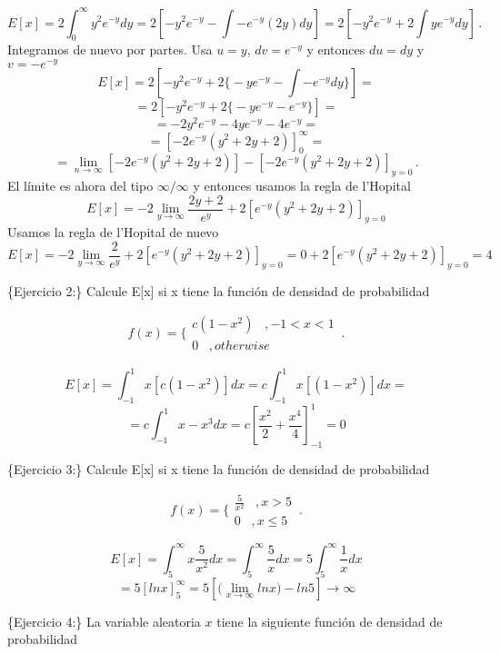 \documentclass[
]{agujournal2019}
\begin{document}
\[E[x]=2\int^\infty_0y^2e^{-y}dy=2\left[ -y^2e^{-y}-\int-e^{-y}(2y)dy\right]
      =2\left[ -y^2e^{-y}+2\int ye^{-y}dy\right]\,.\] Integramos de
nuevo por partes. Usa \(u=y\), \(dv=e^{-y}\) y entonces \(du=dy\) y
\(v=-e^{-y}\)
\[E[x]=2\left[ -y^2 e^{-y} + 2 \Big\{ -y e^{-y} - \int -e^{-y}dy \Big\} \right]=\]
\[=2\left[ -y^2 e^{-y} + 2 \Big\{ -y e^{-y} - e^{-y}         \Big\} \right]=\]
\[=-2y^2e^{-y}-4ye^{-y}-4e^{-y}=\]
\[=\left[ -2e^{-y}(y^2+2y+2) \right]^{\infty}_0=\]
\[=\lim_{n \to\infty}\left[ -2e^{-y}(y^2+2y+2) \right]-\left[ -2e^{-y}(y^2+2y+2) \right]_{y=0}\,.\]
El límite es ahora del tipo \(\infty/\infty\) y entonces usamos la regla
de l'Hopital
\[E[x]=-2\lim_{y \to\infty}\frac{2y+2}{e^y}+2\left[e^{-y}(y^2+2y+2) \right]_{y=0}\]
Usamos la regla de l'Hopital de nuevo
\[E[x]=-2\lim_{y \to\infty}\frac{2}{e^y}+2\left[e^{-y}(y^2+2y+2) \right]_{y=0}
=0+2\left[e^{-y}(y^2+2y+2) \right]_{y=0}=4\]

\vspace{0.5cm}

\{\noindent  Ejercicio 2:\} Calcule E{[}x{]} si x tiene la función de
densidad de probabilidad

\[f(x)=\Bigg\{\begin{array}{c}
 c(1-x^2)\,\,\,\,\,,-1<x<1 \\ 0 \,\,\,\,\,,otherwise
       \end{array} \,.\]

\[E[x]=\int^1_{-1} x[c(1-x^2)]dx=c \int^1_{-1} x[(1-x^2)]dx=\]
\[=c \int^1_{-1} x-x^3dx=c\left[\frac{x^2}{2}+\frac{x^4}{4}\right]^{1}_{-1}=0\]

\vspace{0.5cm}

\{\noindent  Ejercicio 3:\} Calcule E{[}x{]} si x tiene la función de
densidad de probabilidad

\[f(x)=\Bigg\{\begin{array}{c}
 \frac{5}{x^2}\,\,\,\,\,,x>5 \\ 0 \,\,\,\,\,,x\le5
       \end{array} \,.\]

\[E[x]=\int^{\infty}_{5}x\frac{5}{x^2}dx=\int^{\infty}_{5}\frac{5}{x}dx=5\int^{\infty}_{5}\frac{1}{x}dx\]
\[=5[lnx]^{\infty}_5=5\left[\Big(\lim_{x \to\infty} ln{x}\Big)-ln{5}\right]\rightarrow \infty\]

\vspace{0.5cm}

\{\noindent  Ejercicio 4:\} La variable aleatoria \(x\) tiene la
siguiente función de densidad de probabilidad
\end{document}
